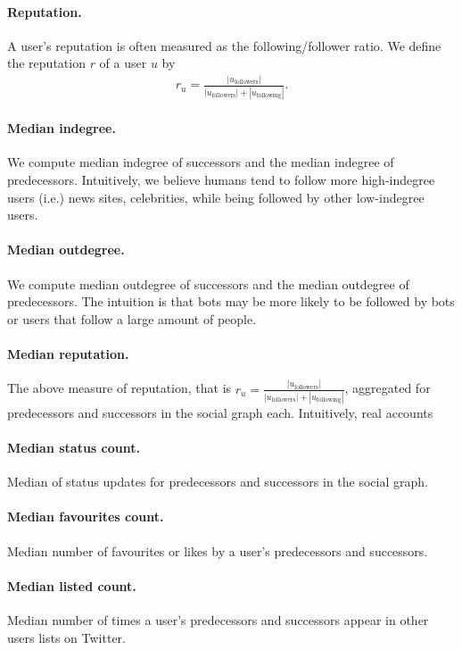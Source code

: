 \paragraph{Reputation.} A user's reputation is often measured as the following/follower ratio. We define the reputation $r$ of a user $u$ by
\begin{align*}
    r_u = \frac{ |u_\text{followers}| }{ |u_\text{followers}| + |u_\text{following}|}.
\end{align*}

\paragraph{Median indegree.} We compute median indegree of successors and the median indegree of predecessors. Intuitively, we believe humans tend to follow more high-indegree users (i.e.) news sites, celebrities, while being followed by other low-indegree users.

\paragraph{Median outdegree.} We compute median outdegree of successors and the median outdegree of predecessors. The intuition is that bots may be more likely to be followed by bots or users that follow a large amount of people.

\paragraph{Median reputation.} The above measure of reputation, that is $r_u = \frac{ |u_\text{followers}| }{ |u_\text{followers}| + |u_\text{following}|}$, aggregated for predecessors and successors in the social graph each. Intuitively, real accounts 

\paragraph{Median status count.} Median of status updates for predecessors and successors in the social graph.

\paragraph{Median favourites count.} Median number of favourites or likes by a user's predecessors and successors.

\paragraph{Median listed count.} Median number of times a user's predecessors and successors appear in other users lists on Twitter.

